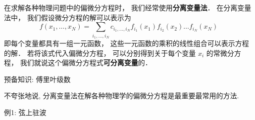
\begin{issues}
\issueDraft
\end{issues}


在求解各种物理问题中的偏微分方程时， 我们经常使用\textbf{分离变量法}． 在分离变量法中， 我们假设微分方程的解可以表示为
\begin{equation}\label{SepVar_eq2}
f(x_1, \dots , x_N) = \sum_{i_1, \dots, i_N} c_{i_1, \dots, i_N} f_{i_1}(x_1) f_{i_2}(x_2) \dots f_{i_N}(x_N)
\end{equation}
即每个变量都具有一组一元函数， 这些一元函数的乘积的线性组合可以表示方程的解． 若将该式代入偏微分方程， 可以分别得到关于每个变量 $x_i$ 的常微分方程， 我们就说这个偏微分方程式\textbf{可分离变量}的．


预备知识: 傅里叶级数

不夸张地说, 分离变量法在解各种物理学的偏微分方程是最重要最常用的方法.

例1: 弦上驻波

